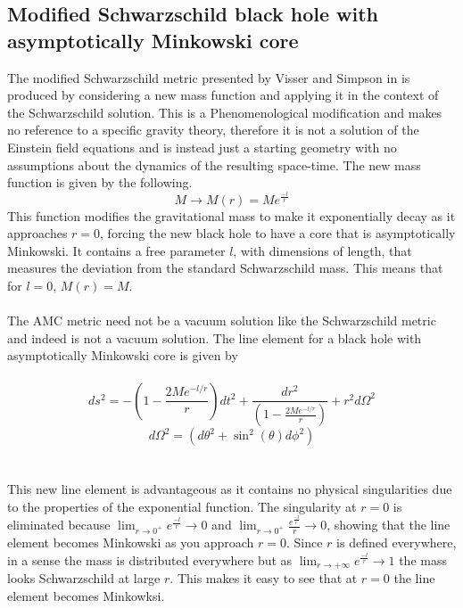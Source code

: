 \documentclass[12pt]{iopart}
\begin{document}
\subsection{Modified Schwarzschild black hole with asymptotically Minkowski core}
The modified Schwarzschild metric presented by Visser and Simpson in \cite{Simpson:2019mud} is produced by considering a new mass function and applying it in the context of the Schwarzschild solution. This is a Phenomenological modification and makes no reference to a specific gravity theory, therefore it is not a solution of the Einstein field equations and is instead just a starting geometry with no assumptions about the dynamics of the resulting space-time. The new mass function is given by the following.
\begin{equation}
M \rightarrow M(r) = Me^{\frac{-l}{r}}
\end{equation}
This function modifies the gravitational mass to make it exponentially decay as it approaches $r=0$, forcing the new black hole to have a core that is asymptotically Minkowski.  It contains a free parameter $l$, with dimensions of length, that measures the deviation from the standard Schwarzschild mass. This means that for $l=0$, $M(r) = M$.
\\
\\
The AMC metric need not be a vacuum solution like the Schwarzschild metric and indeed is not a vacuum solution. The line element for a black hole with asymptotically Minkowski core is given by 
\\
\\
\begin{equation}
ds^2 = -(1-\frac{2Me^{-l/r}}{r})dt^2 + \frac{dr^2}{(1-\frac{2Me^{-l/r}}{r})}+r^2d\Omega^2 
\end{equation}
\begin{equation}
d\Omega^2 = (d\theta^2+\sin^2(\theta)d\phi^2)
\end{equation}
\\
\\
This new line element is advantageous as it contains no physical singularities due to the properties of the exponential function. The singularity at $r=0$ is eliminated because $\lim_{r\to 0^+} e^{\frac{-l}{r}} \rightarrow 0$  and $\lim_{r\to 0^+} \frac{e^{\frac{-l}{r}}}{r} \rightarrow 0$, showing that the line element becomes Minkowski as you approach $r=0$. Since $r$ is defined everywhere, in a sense the mass is distributed everywhere but as $\lim_{r\to +\infty} e^{\frac{-l}{r}} \rightarrow 1$ the mass looks Schwarzschild at large $r$. This makes it easy to see that at $r=0$ the line element becomes Minkowksi.
\\
\\
\end{document}
